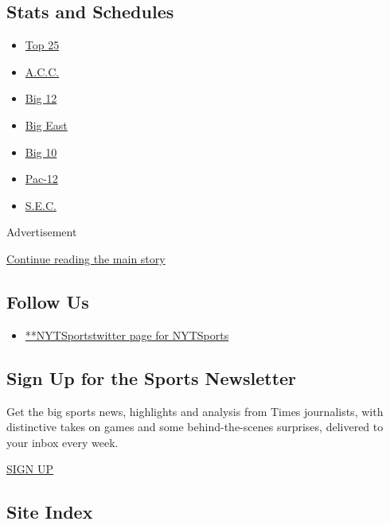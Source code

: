 \hypertarget{stats-and-schedules}{%
\subsection{Stats and Schedules}\label{stats-and-schedules}}

\begin{itemize}
\tightlist
\item
  \protect\hyperlink{}{Top 25}
\item
  \protect\hyperlink{}{A.C.C.}
\item
  \protect\hyperlink{}{Big 12}
\item
  \protect\hyperlink{}{Big East}
\item
  \protect\hyperlink{}{Big 10}
\item
  \protect\hyperlink{}{Pac-12}
\item
  \protect\hyperlink{}{S.E.C.}
\end{itemize}

Advertisement

\protect\hyperlink{after-mktg}{Continue reading the main story}

\hypertarget{follow-us}{%
\subsection{Follow Us}\label{follow-us}}

\begin{itemize}
\tightlist
\item
  \href{https://twitter.com/NYTSports}{**NYTSportstwitter page for
  NYTSports}
\end{itemize}

\hypertarget{sign-up-for-the-sports-newsletter}{%
\subsection{Sign Up for the Sports
Newsletter}\label{sign-up-for-the-sports-newsletter}}

Get the big sports news, highlights and analysis from Times journalists,
with distinctive takes on games and some behind-the-scenes surprises,
delivered to your inbox every week.

\href{/newsletters/signup/SP}{SIGN UP}

\hypertarget{site-index}{%
\subsection{Site Index}\label{site-index}}

